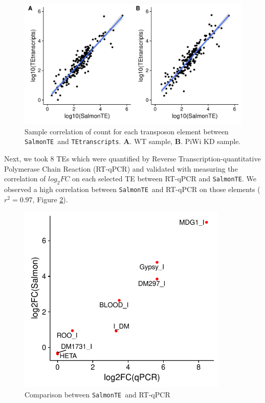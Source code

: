 \documentclass{ws-procs11x85}
\newcommand{\TEtranscripts}{\texttt{TEtranscripts}}
\newcommand{\SalmonTE}{\texttt{SalmonTE}}
\begin{document}
\begin{figure}[h]
\centerline{
\includegraphics[width=13cm]{figure_corr_count}
}
\caption{Sample correlation of count for each transposon element between \SalmonTE~and \TEtranscripts. \textbf{A}. WT sample, \textbf{B}. PiWi KD sample.}
\label{aba:fig3}
\end{figure}

Next, we took 8 TEs which were quantified by
Reverse Transcription-quantitative Polymerase Chain Reaction (RT-qPCR)
and validated with measuring the correlation of $log_{2}FC$ on each selected TE between RT-qPCR and \SalmonTE.
We observed a high correlation between \SalmonTE~and RT-qPCR on those elements ($r^2=0.97$, Figure \ref{aba:fig4}). 

\begin{figure}[h]
\centerline{
\includegraphics[width=10cm]{supp_fig3_corr}
}
\caption{Comparison between \SalmonTE~and RT-qPCR}
\label{aba:fig4}
\end{figure}
\end{document}
